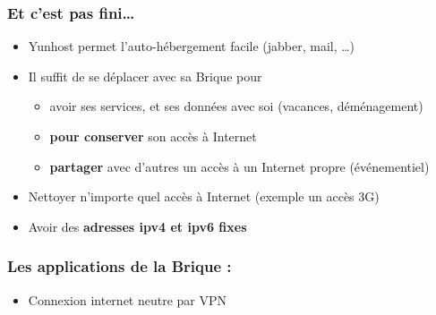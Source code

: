 \documentclass[notes=hide]{beamer}
\begin{document}
\begin{frame}[t]
\frametitle{\textcolor{titre}{Et c'est pas fini…}}
\vfill
\begin{center}
\begin{itemize}
    \item Yunhost permet l'auto-hébergement facile (jabber, mail, …)
    \item Il suffit de se déplacer avec sa Brique pour
    \begin{itemize}
      \item avoir ses services, et ses données avec soi (vacances, déménagement)
      \item \textbf{pour conserver} son accès à Internet
      \item \textbf{partager} avec d'autres un accès à un Internet propre (événementiel)
    \end{itemize}
    \pause
  \item Nettoyer n'importe quel accès à Internet (exemple un accès 3G)
  \item Avoir des \textbf{adresses ipv4 et ipv6 fixes}
\end{itemize}
\end{center}
\end{frame}



\begin{frame}[t]
\frametitle{\textcolor{titre}{Les applications de la Brique :}}
\vfill
\begin{center}
\begin{itemize}
    \item Connexion internet neutre par VPN
\end{itemize}
\end{center}
\end{frame}
\end{document}
